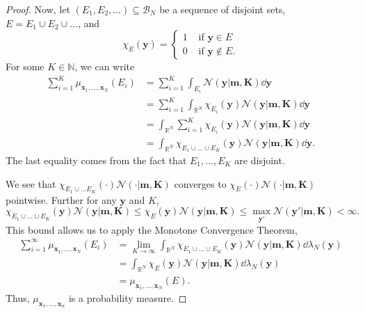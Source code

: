 \begin{proof}
    Now, let $(E_1, E_2, \dots) \subseteq \mathcal{B}_{N}$ be a sequence of disjoint sets, $E = E_1 \cup E_2 \cup \dots$, and
    \begin{equation*}
        \chi_{E}(\mathbf{y}) =
        \begin{cases}
            1 & \text{ if $\mathbf{y} \in E$} \\
            0 & \text{ if $\mathbf{y} \notin E$}.
        \end{cases}
    \end{equation*}
    For some $K \in \mathbb{N}$, we can write
    \begin{align*}
        \sum_{i = 1}^{K} \mu_{\mathbf{x}_1, \dots, \mathbf{x}_N}(E_i)
        & = \sum_{i = 1}^{K} \int_{E_i} \mathcal{N}(\mathbf{y} | \mathbf{m}, \mathbf{K}) \dd \mathbf{y} \\
        & = \sum_{i = 1}^{K} \int_{\mathbb{R}^{N}} \chi_{E_i}(\mathbf{y})\mathcal{N}(\mathbf{y} | \mathbf{m}, \mathbf{K}) \dd \mathbf{y} \\
        & =  \int_{\mathbb{R}^{N}} \sum_{i = 1}^{K}\chi_{E_i}(\mathbf{y})\mathcal{N}(\mathbf{y} | \mathbf{m}, \mathbf{K}) \dd \mathbf{y} \\
        & =  \int_{\mathbb{R}^{N}} \chi_{E_1 \cup \dots \cup E_K}(\mathbf{y})\mathcal{N}(\mathbf{y} | \mathbf{m}, \mathbf{K}) \dd \mathbf{y}.
    \end{align*}
    The last equality comes from the fact that $E_1, \dots, E_K$ are disjoint.

    We see that $\chi_{E_1 \cup \dots E_K}(\cdot)\mathcal{N}(\cdot | \mathbf{m}, \mathbf{K})$ converges to $\chi_E(\cdot) \mathcal{N}(\cdot | \mathbf{m}, \mathbf{K})$ pointwise.
    Further for any $\mathbf{y}$ and $K$,
    \begin{equation*}
        \chi_{E_1 \cup \dots \cup E_K}(\mathbf{y}) \mathcal{N}(\mathbf{y} | \mathbf{m}, \mathbf{K})
        \leq
        \chi_E(\mathbf{y}) \mathcal{N}(\mathbf{y} | \mathbf{m}, \mathbf{K})
        \leq \max_{\mathbf{y}'}\mathcal{N}(\mathbf{y'} | \mathbf{m}, \mathbf{K})
        < \infty.
    \end{equation*}
    This bound allows us to apply the Monotone Convergence Theorem,
    \begin{align*}
        \sum_{i = 1}^{\infty} \mu_{\mathbf{x}_1, \dots, \mathbf{x}_N}(E_i)
        & = \lim_{K \to \infty}\int_{\mathbb{R}^{N}} \chi_{E_1 \cup \dots \cup E_K}(\mathbf{y})\mathcal{N}(\mathbf{y} | \mathbf{m}, \mathbf{K}) \dd \lambda_N(\mathbf{y}) \\
        & = \int_{\mathbb{R}^{N}} \chi_{E}(\mathbf{y})\mathcal{N}(\mathbf{y} | \mathbf{m}, \mathbf{K}) \dd \lambda_N(\mathbf{y}) \\
        & = \mu_{\mathbf{x}_1, \dots, \mathbf{x}_N}(E).
    \end{align*}
    Thus, $\mu_{\mathbf{x}_1, \dots, \mathbf{x}_n}$ is a probability measure.


\end{proof}
